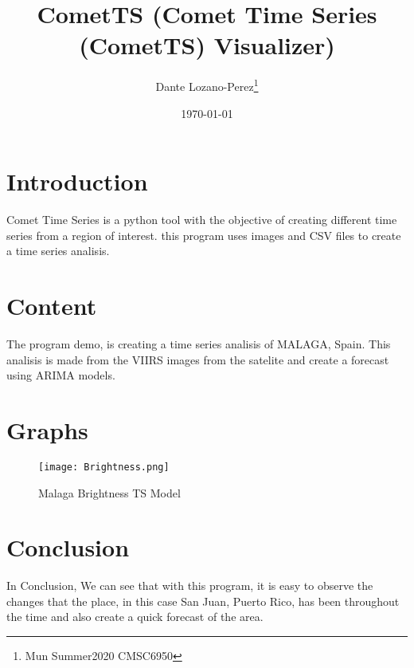 \documentclass{article}
\begin{document}
\title{CometTS (Comet Time Series (CometTS) Visualizer)} 
\author{Dante Lozano-Perez\thanks{Mun Summer2020 CMSC6950}}
\date{\today}

\maketitle

\section{Introduction}
Comet Time Series is a python tool with the objective of creating different time series from a region of interest. this program uses images and CSV files to create a time series analisis.


\section{Content}

The program demo, is creating a time series analisis of MALAGA, Spain. This analisis is made from the VIIRS images from the satelite and create a forecast using ARIMA models.


\section{Graphs}

    \begin{figure}[h!]
        \centering
        \texttt{[image: Brightness.png]}
        \caption{Malaga Brightness TS Model}
        \label{fig:ARIMA1}
        \end{figure}



\section{Conclusion}
In Conclusion, We can see that with this program, it is easy to observe the changes that the place, in this case San Juan, Puerto Rico, has been throughout the time and also create a quick forecast of the area.
\end{document}
